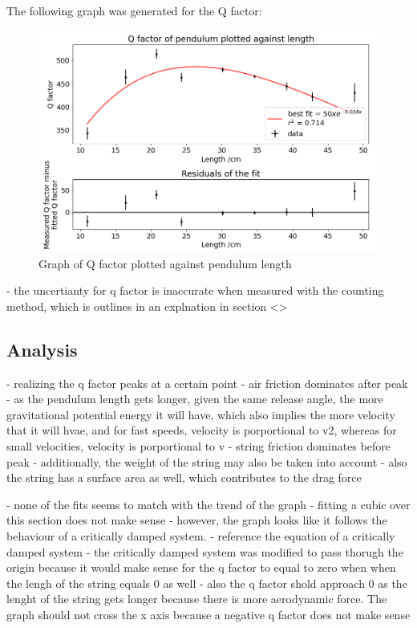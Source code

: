 \documentclass[12pt]{article}
\begin{document}
{The following graph was generated for the Q factor:
\begin{figure}[!hptb]
    \centering
    \includegraphics[width=\textwidth]{../figures/qfactor_vs_length.png}
    \caption{Graph of Q factor plotted against pendulum length}
    \label{fig:figure 7}
\end{figure}

- the uncertianty for q factor is inaccurate when measured with the counting method, which is outlines in an explnation in section <>


\subsection{Analysis}

- realizing the q factor peaks at a certain point
- air friction dominates after peak
- as the pendulum length gets longer, given the same release angle, the more gravitational potential energy it will have, which also implies the more velocity that it will hvae, and for fast speeds, velocity is porportional to v2, whereas for small velocities, velocity is porportional to v
- string friction dominates before peak
- additionally, the weight of the string may also be taken into account
- also the string has a surface area as well, which contributes to the drag force

- none of the fits seems to match with the trend of the graph
- fitting a cubic over this section does not make sense
- however, the graph looks like it follows the behaviour of a critically damped system.
- reference the equation of a critically damped system
- the critically damped system was modified to pass thorugh the origin because it would make sense for the q factor to equal to zero when when the lengh of the string equals 0 as well
- also the q factor shold approach 0 as the lenght of the string gets longer because there is more aerodynamic force. The graph should not cross the x axis because a negative q factor does not make sense

}
\end{document}

